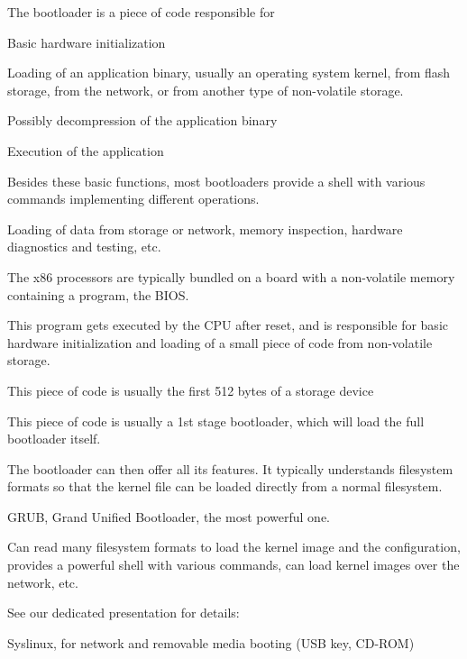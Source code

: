   \startitemize
  \item The bootloader is a piece of code responsible for
    \startitemize
    \item Basic hardware initialization
    \item Loading of an application binary, usually an operating
      system kernel, from flash storage, from the network, or from
      another type of non-volatile storage.
    \item Possibly decompression of the application binary
    \item Execution of the application
    \stopitemize
  \item Besides these basic functions, most bootloaders provide a
    shell with various commands implementing different operations.
    \startitemize
    \item Loading of data from storage or network, memory inspection,
      hardware diagnostics and testing, etc.
    \stopitemize
  \stopitemize

    \startitemize
    \item The x86 processors are typically bundled on a board with a
      non-volatile memory containing a program, the BIOS.
    \item This program gets executed by the CPU after reset, and is
      responsible for basic hardware initialization and loading of a
      small piece of code from non-volatile storage.
      \startitemize
      \item This piece of code is usually the first 512 bytes of a
        storage device
      \stopitemize
    \item This piece of code is usually a 1st stage bootloader, which
      will load the full bootloader itself.
    \item The bootloader can then offer all its features. It typically
      understands filesystem formats so that the kernel file can be
      loaded directly from a normal filesystem.
    \stopitemize

  \startitemize
  \item GRUB, Grand Unified Bootloader, the most powerful one.\\
    \startitemize
    \item Can read many filesystem formats to load the kernel image
      and the configuration, provides a powerful shell with various
      commands, can load kernel images over the network, etc.
    \item See our dedicated presentation for details:\\
    \stopitemize
  \item Syslinux, for network and removable media booting (USB key, CD-ROM)\\
  \stopitemize

